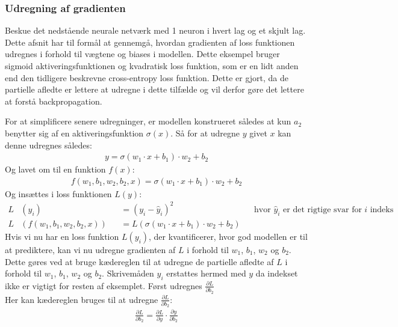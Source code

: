 \documentclass{article}
\begin{document}
\subsubsection{Udregning af gradienten}
Beskue det nedstående neurale netværk med 1 neuron i hvert lag og et skjult lag. Dette afsnit har til formål at gennemgå, hvordan gradienten af loss funktionen udregnes i forhold til vægtene og biases i modellen. Dette eksempel bruger sigmoid aktiveringsfunktionen og kvadratisk loss funktion, som er en lidt anden end den tidligere beskrevne cross-entropy loss funktion. Dette er gjort, da de partielle afledte er lettere at udregne i dette tilfælde og vil derfor gøre det lettere at forstå backpropagation.
\begin{center}
  
  \label{fig:neural_network3}
\end{center}
For at simplificere senere udregninger, er modellen konstrueret således at kun $a_2$ benytter sig af en aktiveringsfunktion $\sigma(x)$. Så for at udregne $y$ givet $x$ kan denne udregnes således:
\begin{align}
  y= \sigma(w_1 \cdot x + b_1) \cdot w_2 + b_2  
\end{align}
Og lavet om til en funktion $f(x)$:
\begin{align}
  f(w_1, b_1, w_2, b_2, x) = \sigma(w_1 \cdot x + b_1) \cdot w_2 + b_2
\end{align}
Og insættes i loss funktionen $L(y)$:
\begin{align}
  L&(y_i) &&= (y_i - \hat{y}_i)^2 && \text{hvor } \hat{y}_i \text{ er det rigtige svar for $i$ indeks}\\
  L&(f(w_1, b_1, w_2, b_2, x)) &&= L(\sigma(w_1 \cdot x + b_1) \cdot w_2 + b_2)
  \label{eq:full_loss}
\end{align}
Hvis vi nu har en loss funktion $L(y_i)$, der kvantificerer, hvor god modellen er til at prediktere, kan vi nu udregne gradienten af $L$ i forhold til $w_1$, $b_1$, $w_2$ og $b_2$. Dette gøres ved at bruge kædereglen til at udregne de partielle afledte af $L$ i forhold til $w_1$, $b_1$, $w_2$ og $b_2$. Skrivemåden $y_i$ erstattes hermed med $y$ da indekset ikke er vigtigt for resten af eksemplet. Først udregnes $\frac{\partial L}{\partial b_2}$\\
Her kan kædereglen bruges til at udregne $\frac{\partial L}{\partial b_2}$:
\begin{align}
  \frac{\partial L}{\partial b_2} = \frac{\partial L}{\partial y} \cdot \frac{\partial y}{\partial b_2}
\end{align}
\end{document}
